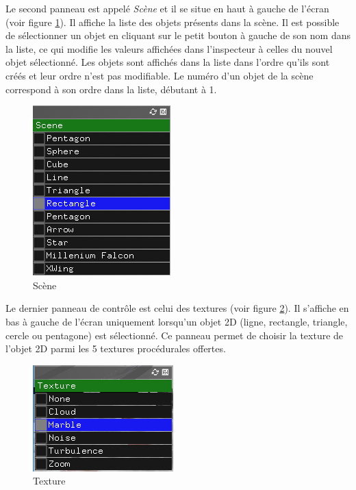 Le second panneau est appelé \emph{Scène} et il se situe en haut à gauche de l'écran (voir figure \ref{fig:scene}).
Il affiche la liste des objets présents dans la scène.
Il est possible de sélectionner un objet en cliquant sur le petit bouton à gauche de son nom dans la liste, ce qui modifie les valeurs affichées dans l'inspecteur à celles du nouvel objet sélectionné.
Les objets sont affichés dans la liste dans l'ordre qu'ils sont créés et leur ordre n'est pas modifiable.
Le numéro d'un objet de la scène correspond à son ordre dans la liste, débutant à 1.\\

\begin{figure}[H]
    \centering
	\includegraphics[scale=0.6]{fig/scene.png}
	\caption{Scène}
	\label{fig:scene}
\end{figure}

Le dernier panneau de contrôle est celui des textures (voir figure \ref{fig:texture}).
Il s'affiche en bas à gauche de l'écran uniquement lorsqu'un objet 2D (ligne, rectangle, triangle, cercle ou pentagone) est sélectionné.
Ce panneau permet de choisir la texture de l'objet 2D parmi les 5 textures procédurales offertes.

\begin{figure}[H]
    \centering
	\includegraphics[scale=0.6]{fig/texture.png}
	\caption{Texture}
	\label{fig:texture}
\end{figure}
